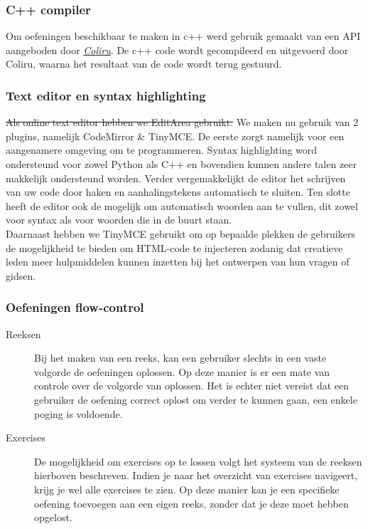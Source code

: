\subsubsection{C++ compiler}
Om oefeningen beschikbaar te maken in c++ werd gebruik gemaakt van een API aangeboden door
\href{http://coliru.stacked-crooked.com/}{\emph{Coliru}}. De c++ code wordt gecompileerd en uitgevoerd door Coliru,
waarna het resultaat van de code wordt terug gestuurd.

\subsubsection{Text editor en syntax highlighting}
\st{Als online text editor hebben we EditArea gebruikt.}
We maken nu gebruik van 2 plugins, namelijk CodeMirror \& TinyMCE. De eerste zorgt namelijk voor een aangenamere
omgeving om te programmeren. Syntax highlighting word ondersteund voor zowel Python als C++ en bovendien kunnen andere
talen zeer makkelijk ondersteund worden. Verder vergemakkelijkt de editor het schrijven van uw code door haken en
aanhalingstekens automatisch te sluiten. Ten slotte heeft de editor ook de mogelijk om automatisch woorden aan te
vullen, dit zowel voor syntax als voor woorden die in de buurt staan.
\\Daarnaast hebben we TinyMCE gebruikt om op bepaalde plekken de gebruikers de mogelijkheid te bieden om HTML-code
te injecteren zodanig dat creatieve leden meer hulpmiddelen kunnen inzetten bij het ontwerpen van hun vragen of gidsen.

\subsubsection{Oefeningen flow-control}
\begin{description}
\item[Reeksen] Bij het maken van een reeks, kan een gebruiker slechts in een vaste volgorde de oefeningen oplossen. Op deze manier is er
een mate van controle over de volgorde van oplossen. Het is echter niet vereist dat een gebruiker de oefening correct oplost
om verder te kunnen gaan, een enkele poging is voldoende.
\item[Exercises] De mogelijkheid om exercises op te lossen volgt het systeem van de reeksen hierboven beschreven. Indien je naar het
    overzicht van exercises navigeert, krijg je wel alle exercises te zien. Op deze manier kan je een specifieke oefening toevoegen 
    aan een eigen reeks, zonder dat je deze moet hebben opgelost.
\end{description}

